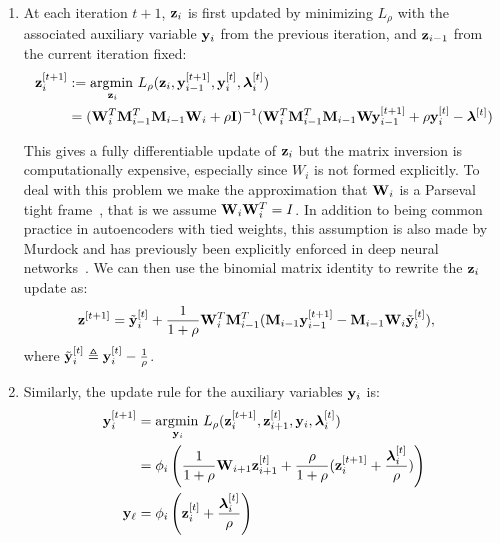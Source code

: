 \begin{enumerate}
\item
 At each iteration $t+1$, $\mathbf{z}_i$ is first updated by minimizing $L_\rho$ with the associated auxiliary variable $\mathbf{y}_i$ from the previous iteration, and $\mathbf{z}_{i-1}$ from the current iteration fixed:
  \begin{equation}
    \begin{aligned}
      \mathbf{z}^{[t+1]}_i &:= \operatorname*{\arg\!\min\,}_{\mathbf{z}_i} L_\rho(\mathbf{z}_i, \mathbf{y}^{[t+1]}_{i-1}, \mathbf{y}^{[t]}_i, \bm{\lambda}_i^{[t]})\\
      &= (\mathbf{W}_i^T\mathbf{M}_{i-1}^T\mathbf{M}_{i-1}\mathbf{W}_i + \rho \mathbf{I})^{-1}(\mathbf{W}_{i}^T\mathbf{M}_{i-1}^T\mathbf{M}_{i-1}\mathbf{W}\mathbf{y}^{[t+1]}_{i-1} + \rho \mathbf{y}^{[t]}_{i} - \bm{\lambda}^{[t]})
    \end{aligned}
    \label{eq:wupdate1}  
  \end{equation}

  This gives a fully differentiable update of $\mathbf{z}_i$ but the matrix inversion is computationally expensive, especially since $W_i$ is not formed explicitly. To deal with this problem we make the approximation that $\mathbf{W}_i$ is a Parseval tight frame~\cite{}, that is we assume $\mathbf{W}_i\mathbf{W}_i^T = I$. In addition to being common practice in autoencoders with tied weights, this assumption is also made by Murdock \etal and has previously been explicitly enforced in deep neural networks~\cite{}. We can then use the binomial matrix identity to rewrite the $\mathbf{z}_i$ update as:
  \begin{equation}
    \begin{aligned}
      \mathbf{z}^{[t+1]} &= \tilde{\mathbf{y}}_i^{[t]} + \frac{1}{1 + \rho}\mathbf{W}^T_i\mathbf{M}_{i-1}^T(\mathbf{M}_{i-1}\mathbf{y}^{[t+1]}_{i-1} - \mathbf{M}_{i-1}\mathbf{W}_i\tilde{\mathbf{y}}^{[t]}_i),
    \end{aligned}\label{eq:zupdate}
  \end{equation}
  where $\tilde{\mathbf{y}}_i^{[t]} \triangleq \mathbf{y}_i^{[t]} - \frac{1}{\rho}$.
\item
 Similarly, the update rule for the auxiliary variables $\mathbf{y}_i$ is:
  \begin{equation}
    \begin{aligned}
      \mathbf{y}_i^{[t+1]} & = \operatorname*{\arg\!\min\,}_{\mathbf{y}_i} L_\rho(\mathbf{z}^{[t+1]}_i, \mathbf{z}^{[t]}_{i+1}, \mathbf{y}_i, \bm{\lambda}_i^{[t]})\\
      &= \phi_i\left(\frac{1}{1+\rho}\mathbf{W}_{i+1}\mathbf{z}^{[t]}_{i+1} + \frac{\rho}{1+\rho}(\mathbf{z}^{[t+1]}_i + \frac{\bm{\lambda}_i^{[t]}}{\rho})\right)\\
      \mathbf{y}_{\ell} &= \phi_i\left(\mathbf{z}_i^{[t]} + \frac{\bm{\lambda}_i^{[t]}}{\rho}\right)
    \end{aligned}\label{eq:yupdate}
  \end{equation}


\end{enumerate}
